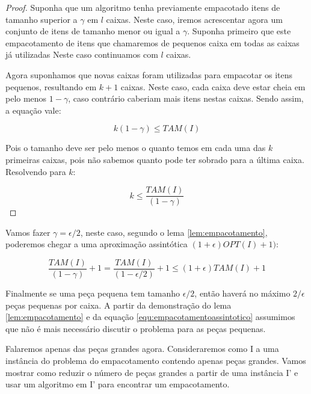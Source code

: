\begin{proof}

Suponha que um algoritmo tenha previamente empacotado itens de tamanho superior a $\gamma$ em $l$ caixas. Neste caso, iremos acrescentar agora um conjunto de itens de tamanho menor ou igual a $\gamma$. Suponha primeiro que este empacotamento de itens que chamaremos de pequenos caixa em todas as caixas já utilizadas Neste caso continuamos com $l$ caixas.

Agora suponhamos que novas caixas foram utilizadas para empacotar os itens pequenos, resultando em $k+1$ caixas. Neste caso, cada caixa deve estar cheia em pelo menos $1-\gamma$, caso contrário caberiam mais itens nestas caixas. Sendo assim, a equação vale:

\begin{equation}
k(1-\gamma) \leq TAM(I) 
\end{equation}

Pois o tamanho deve ser pelo menos o quanto temos em cada uma das $k$ primeiras caixas, pois não sabemos quanto pode ter sobrado para a última caixa. Resolvendo para $k$:

\begin{equation}
k \leq \frac{TAM(I)}{(1-\gamma)} 
\end{equation}

\end{proof}

Vamos fazer $\gamma = \epsilon/2$, neste caso, segundo o lema \ref{lem:empacotamento}, poderemos chegar a uma aproximação assintótica $(1+\epsilon) OPT(I) + 1)$:

\begin{equation}
\label{equ:empacotamentoassintotico}
\frac{TAM(I)}{(1-\gamma)} + 1 = \frac{TAM(I)}{(1-\epsilon/2)} + 1 \leq (1+\epsilon) TAM(I) + 1
\end{equation}

Finalmente se uma peça pequena tem tamanho $\epsilon/2$, então haverá no máximo $2/\epsilon$ peças pequenas por caixa. A partir da demonstração do lema \ref{lem:empacotamento} e da equação \ref{equ:empacotamentoassintotico} assumimos que não é mais necessário discutir o problema para as peças pequenas.

Falaremos apenas das peças grandes agora. Consideraremos como I a uma instância do problema do empacotamento contendo apenas peças grandes. Vamos mostrar como reduzir o número de peças grandes a partir de uma instância I' e usar um algoritmo em I' para encontrar um empacotamento.

